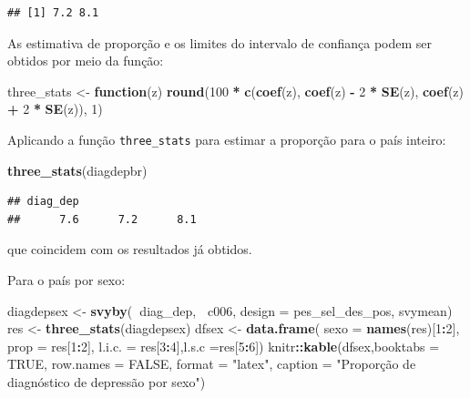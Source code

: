 \documentclass[]{book}
\newenvironment{Shaded}{\begin{snugshade}}{\end{snugshade}}
\newcommand{\KeywordTok}[1]{\textcolor[rgb]{0.13,0.29,0.53}{\textbf{#1}}}
\newcommand{\DataTypeTok}[1]{\textcolor[rgb]{0.13,0.29,0.53}{#1}}
\newcommand{\DecValTok}[1]{\textcolor[rgb]{0.00,0.00,0.81}{#1}}
\newcommand{\StringTok}[1]{\textcolor[rgb]{0.31,0.60,0.02}{#1}}
\newcommand{\OtherTok}[1]{\textcolor[rgb]{0.56,0.35,0.01}{#1}}
\newcommand{\ControlFlowTok}[1]{\textcolor[rgb]{0.13,0.29,0.53}{\textbf{#1}}}
\newcommand{\OperatorTok}[1]{\textcolor[rgb]{0.81,0.36,0.00}{\textbf{#1}}}
\newcommand{\NormalTok}[1]{#1}
\theoremstyle{definition}
\theoremstyle{definition}
\theoremstyle{definition}
\theoremstyle{remark}
\begin{document}
\begin{verbatim}
## [1] 7.2 8.1
\end{verbatim}

As estimativa de proporção e os limites do intervalo de confiança podem
ser obtidos por meio da função:

\begin{Shaded}
\begin{Highlighting}[]
\NormalTok{three_stats <-}\StringTok{ }\ControlFlowTok{function}\NormalTok{(z) }\KeywordTok{round}\NormalTok{(}\DecValTok{100} \OperatorTok{*}\StringTok{ }\KeywordTok{c}\NormalTok{(}\KeywordTok{coef}\NormalTok{(z), }\KeywordTok{coef}\NormalTok{(z) }\OperatorTok{-}\StringTok{ }
\StringTok{  }\DecValTok{2} \OperatorTok{*}\StringTok{ }\KeywordTok{SE}\NormalTok{(z), }\KeywordTok{coef}\NormalTok{(z) }\OperatorTok{+}\StringTok{ }\DecValTok{2} \OperatorTok{*}\StringTok{ }\KeywordTok{SE}\NormalTok{(z)), }\DecValTok{1}\NormalTok{)}
\end{Highlighting}
\end{Shaded}

Aplicando a função \texttt{three\_stats} para estimar a proporção para o
país inteiro:

\begin{Shaded}
\begin{Highlighting}[]
\KeywordTok{three_stats}\NormalTok{(diagdepbr)}
\end{Highlighting}
\end{Shaded}

\begin{verbatim}
## diag_dep                   
##      7.6      7.2      8.1
\end{verbatim}

que coincidem com os resultados já obtidos.

Para o país por sexo:

\begin{Shaded}
\begin{Highlighting}[]
\NormalTok{diagdepsex <-}\StringTok{ }\KeywordTok{svyby}\NormalTok{(}\OperatorTok{~}\NormalTok{diag_dep, }\OperatorTok{~}\NormalTok{c006, }\DataTypeTok{design =}\NormalTok{ pes_sel_des_pos, }
\NormalTok{  svymean)}
\NormalTok{res <-}\StringTok{ }\KeywordTok{three_stats}\NormalTok{(diagdepsex)}
\NormalTok{dfsex <-}\StringTok{ }\KeywordTok{data.frame}\NormalTok{( }\DataTypeTok{sexo =} \KeywordTok{names}\NormalTok{(res)[}\DecValTok{1}\OperatorTok{:}\DecValTok{2}\NormalTok{], }\DataTypeTok{prop =}\NormalTok{ res[}\DecValTok{1}\OperatorTok{:}\DecValTok{2}\NormalTok{], }\DataTypeTok{l.i.c. =}\NormalTok{ res[}\DecValTok{3}\OperatorTok{:}\DecValTok{4}\NormalTok{],}\DataTypeTok{l.s.c =}\NormalTok{res[}\DecValTok{5}\OperatorTok{:}\DecValTok{6}\NormalTok{])}
\NormalTok{knitr}\OperatorTok{::}\KeywordTok{kable}\NormalTok{(dfsex,}\DataTypeTok{booktabs =} \OtherTok{TRUE}\NormalTok{, }\DataTypeTok{row.names =} \OtherTok{FALSE}\NormalTok{, }\DataTypeTok{format =} \StringTok{"latex"}\NormalTok{, }
\DataTypeTok{caption =} \StringTok{"Proporção de diagnóstico de depressão por sexo"}\NormalTok{)}
\end{Highlighting}
\end{Shaded}
\end{document}

